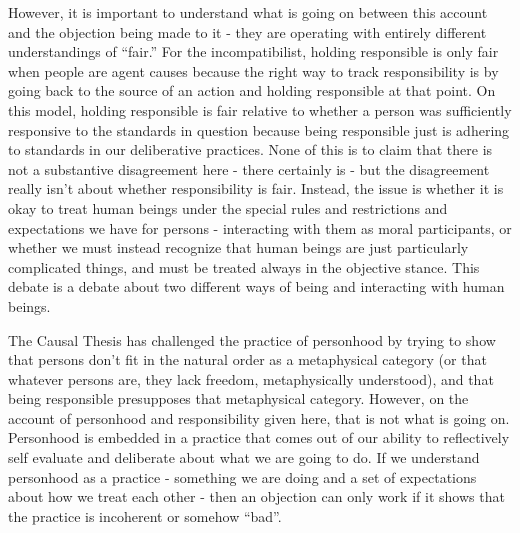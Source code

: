 \documentclass[phd,12pt,oneside,paper=letterpaper]{ubcthesis}
\begin{document}
However, it is important to understand what is going on between this account and the objection being made to it - they are operating with entirely different understandings of ``fair.'' For the incompatibilist, holding responsible is only fair when people are agent causes because the right way to track responsibility is by going back to the source of an action and holding responsible at that point. On this model, holding responsible is fair relative to whether a person was sufficiently responsive to the standards in question because being responsible just is adhering to standards in our deliberative practices. None of this is to claim that there is not a substantive disagreement here - there certainly is - but the disagreement really isn't about whether responsibility is fair. Instead, the issue is whether it is okay to treat human beings under the special rules and restrictions and expectations we have for persons - interacting with them as moral participants, or whether we must instead recognize that human beings are just particularly complicated things, and must be treated always in the objective stance. This debate is a debate about two different ways of being and interacting with human beings.

The Causal Thesis has challenged the practice of personhood by trying to show that persons don't fit in the natural order as a metaphysical category (or that whatever persons are, they lack freedom, metaphysically understood), and that being responsible presupposes that metaphysical category. However, on the account of personhood and responsibility given here, that is not what is going on. Personhood is embedded in a practice that comes out of our ability to reflectively self evaluate and deliberate about what we are going to do. If we understand personhood as a practice - something we are doing and a set of expectations about how we treat each other - then an objection can only work if it shows that the practice is incoherent or somehow ``bad''. 
\end{document}

